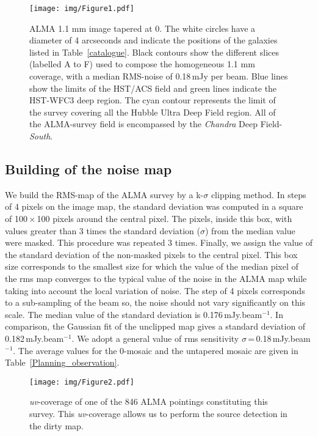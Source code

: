 \documentclass[longauth]{aa}
\begin{document}
   \begin{figure*}
   \centering
   \texttt{[image: img/Figure1.pdf]}
      \caption{ALMA 1.1 mm image tapered at 0. The white circles have a diameter of 4 arcseconds and indicate the positions of the galaxies listed in Table~\ref{catalogue}. Black contours show the different slices (labelled A to F) used to compose the homogeneous 1.1 mm coverage, with a median RMS-noise of 0.18\,mJy per beam.  Blue lines show the limits of the HST/ACS field and green lines indicate the HST-WFC3 deep region. The cyan contour represents the limit of the \cite{Dunlop2017} survey covering all the Hubble Ultra Deep Field region. All of the ALMA-survey field is encompassed by the \textit{Chandra} Deep Field-\textit{South}.}
         \label{map_detection}
   \end{figure*}


\subsection{Building of the noise map}
We build the RMS-map of the ALMA survey by a k-$\sigma$ clipping method. In steps of 4 pixels on the image map, the standard deviation was computed in a square of 100\,$\times$\,100 pixels around the central pixel. The pixels, inside this box, with values greater than 3 times the standard deviation ($\sigma$) from the median value were masked. This procedure was repeated 3 times. Finally, we assign the value of the standard deviation of the non-masked pixels to the central pixel. This box size corresponds to the smallest size for which the value of the median pixel of the rms map converges to the typical value of the noise in the ALMA map while taking into account the local variation of noise. The step of 4 pixels corresponds to a sub-sampling of the beam so, the noise should not vary significantly on this scale. The median value of the standard deviation is 0.176\,mJy.beam$^{-1}$. In comparison, the Gaussian fit of the unclipped map gives a standard deviation of 0.182\,mJy.beam$^{-1}$. We adopt a general value of rms sensitivity $\sigma$\,=\,0.18\,mJy.beam$^{-1}$. The average values for the 0-mosaic and the untapered mosaic are given in Table~\ref{Planning_observation}.


   \begin{figure}
   \centering
   \texttt{[image: img/Figure2.pdf]}
      \caption{\textit{uv}-coverage of one of the 846 ALMA pointings constituting this survey. This \textit{uv}-coverage allows us to perform the source detection in the dirty map.}
         \label{UV_Coverage}
   \end{figure}
\end{document}
